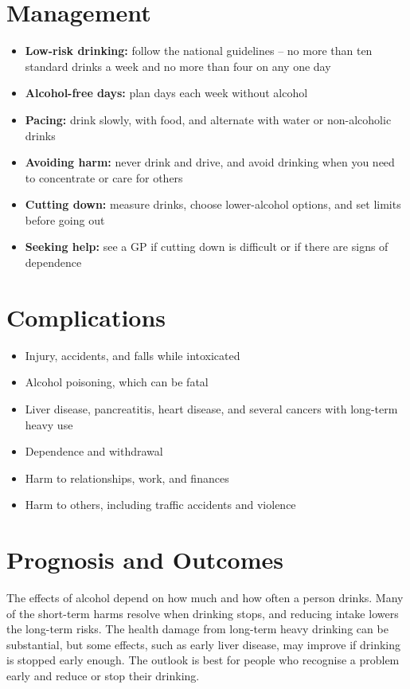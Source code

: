 \section*{Management}
\begin{itemize}
    \item \textbf{Low-risk drinking:} follow the national guidelines -- no more than ten standard drinks a week and no more than four on any one day
    \item \textbf{Alcohol-free days:} plan days each week without alcohol
    \item \textbf{Pacing:} drink slowly, with food, and alternate with water or non-alcoholic drinks
    \item \textbf{Avoiding harm:} never drink and drive, and avoid drinking when you need to concentrate or care for others
    \item \textbf{Cutting down:} measure drinks, choose lower-alcohol options, and set limits before going out
    \item \textbf{Seeking help:} see a GP if cutting down is difficult or if there are signs of dependence
\end{itemize}

\section*{Complications}
\begin{itemize}
    \item Injury, accidents, and falls while intoxicated
    \item Alcohol poisoning, which can be fatal
    \item Liver disease, pancreatitis, heart disease, and several cancers with long-term heavy use
    \item Dependence and withdrawal
    \item Harm to relationships, work, and finances
    \item Harm to others, including traffic accidents and violence
\end{itemize}

\section*{Prognosis and Outcomes}
The effects of alcohol depend on how much and how often a person drinks. Many of the short-term harms resolve when drinking stops, and reducing intake lowers the long-term risks. The health damage from long-term heavy drinking can be substantial, but some effects, such as early liver disease, may improve if drinking is stopped early enough. The outlook is best for people who recognise a problem early and reduce or stop their drinking.

